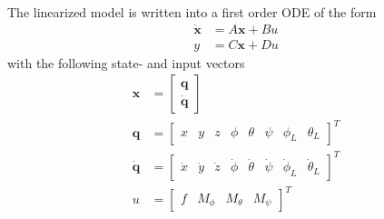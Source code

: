%
%
%
The linearized model is written into a first order ODE of the form
\begin{align}\label{eq:app.ss}
\mathbf{\dot{x} }&=A\mathbf{x}+Bu\\
y&=C\mathbf{x}+Du
\end{align}
with the following state- and input vectors
\begin{equation}\label{key}
\begin{aligned}
\textbf{x}&=\begin{bmatrix}
\textbf{q}\\
\mathbf{\dot{q}}
\end{bmatrix}\\
\mathbf{q}&=\begin{bmatrix}
x&y&z&\phi&\theta&\psi&\phi_L&\theta_L
\end{bmatrix}^T\\
\mathbf{\dot{q}}&=\begin{bmatrix}
\dot{x}&\dot{y}&\dot{z}&\dot{\phi}&\dot{\theta}&\dot{\psi}&\dot{\phi}_L&\dot{\theta}_L
\end{bmatrix}^T\\
u&=\begin{bmatrix}
f&M_\phi&M_\theta&M_\psi
\end{bmatrix}^T
\end{aligned}
\end{equation}

